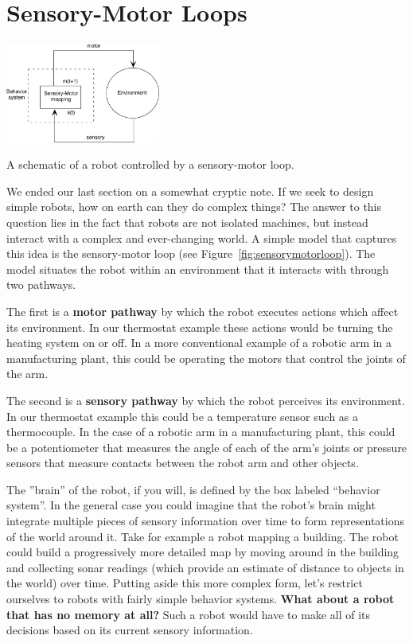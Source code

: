 \documentclass{tufte-handout}
\begin{document}
\section{Sensory-Motor Loops}

\begin{marginfigure}
\begin{center}
\includegraphics[width=2in]{Figures/fnbot-01-002-g001.jpg}
\end{center}
\caption{A schematic of a robot controlled by a sensory-motor loop.\label{fig:sensorymotorloop}}
\end{marginfigure}

We ended our last section on a somewhat cryptic note.  If we seek to design simple robots, how on earth can they do complex things?  The answer to this question lies in the fact that robots are not isolated machines, but instead interact with a complex and ever-changing world.  A simple model that captures this idea is the sensory-motor loop (see Figure~\ref{fig:sensorymotorloop}).  The model situates the robot within an environment that it interacts with through two pathways.

The first is a \textbf{motor pathway} by which the robot executes actions which affect its environment.  In our thermostat example these actions would be turning the heating system on or off.  In a more conventional example of a robotic arm in a manufacturing plant, this could be operating the motors that control the joints of the arm.

The second is a \textbf{sensory pathway} by which the robot perceives its environment.  In our thermostat example this could be a temperature sensor such as a thermocouple.  In the case of a robotic arm in a manufacturing plant, this could be a potentiometer that measures the angle of each of the arm's joints or pressure sensors that measure contacts between the robot arm and other objects.

The ''brain'' of the robot, if you will, is defined by the box labeled ``behavior system''.  In the general case you could imagine that the robot's brain might integrate multiple pieces of sensory information over time to form representations of the world around it. Take for example a robot mapping a building. The robot could build a progressively more detailed map by moving around in the building and collecting sonar readings (which provide an estimate of distance to objects in the world) over time.  Putting aside this more complex form, let's restrict ourselves to robots with fairly simple behavior systems. \textbf{What about a robot that has no memory at all?} Such a robot would have to make all of its decisions based on its current sensory information.
\end{document}
